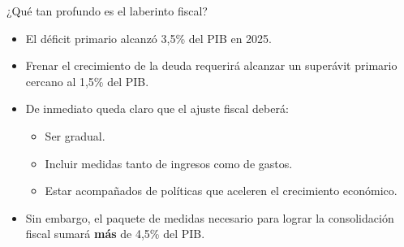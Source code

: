 \begin{frame}{¿Qué tan profundo es el laberinto fiscal?}
    \begin{itemize}
        \item El déficit primario alcanzó 3,5\% del PIB en 2025.
        \item Frenar el crecimiento de la deuda requerirá alcanzar un superávit primario cercano al 1,5\% del PIB.
        \item De inmediato queda claro que el ajuste fiscal deberá:
        \begin{itemize}
            \item Ser gradual.
            \item Incluir medidas tanto de ingresos como de gastos.
            \item Estar acompañados de políticas que aceleren el crecimiento económico.
        \end{itemize}
        \item Sin embargo, el paquete de medidas necesario para lograr la consolidación fiscal sumará \textbf{más} de 4,5\% del PIB. 
        \end{itemize}
\end{frame}
